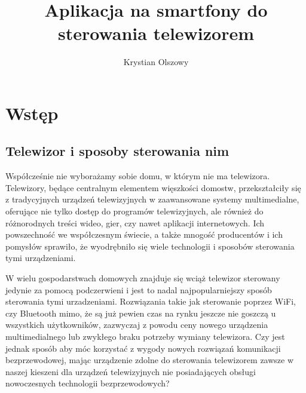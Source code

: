 \documentclass[12pt,twoside,draft]{article}
\author{Krystian Olszowy}
\title{Aplikacja na smartfony do sterowania telewizorem}
\begin{document}
\maketitle

\blankpage

\tableofcontents

\clearpage
\blankpage

\section{Wstęp}
\subsection{Telewizor i sposoby sterowania nim}
{Współcześnie nie wyborażamy sobie domu, w którym nie ma telewizora. Telewizory, będące 
centralnym elementem więszkości domostw, przekształciły się z tradycyjnych urządzeń 
telewizyjnych w zaawansowane systemy multimedialne, oferujące nie tylko dostęp do programów telewizyjnych,
ale również do różnorodnych treści wideo, gier, czy nawet aplikacji internetowych. 
Ich powszechność we współczesnym świecie, a także mnogość producentów i ich pomysłów 
sprawiło, że wyodrębniło się wiele technologii i sposobów sterowania tymi urządzeniami.

W wielu gospodarstwach domowych znajduje się wciąż telewizor sterowany jedynie za pomocą podczerwieni i jest
 to nadal najpopularniejszy sposób sterowania tymi urzadzeniami. Rozwiązania takie jak sterowanie poprzez WiFi, czy Bluetooth
 mimo, że są już pewien czas na rynku jeszcze nie goszczą u wszystkich użytkowników, zazwyczaj z powodu ceny
 nowego urządzenia multimedialnego lub zwykłego braku potrzeby wymiany telewizora. Czy jest jednak sposób aby
móc korzystać z wygody nowych rozwiązań komunikacji bezprzewodowej, mając urządzenie zdolne do sterowania 
telewizorem zawsze w naszej kieszeni dla urządzeń telewizyjnych nie posiadających obsługi nowoczesnych technologii bezprzewodowych?
}
\end{document}
